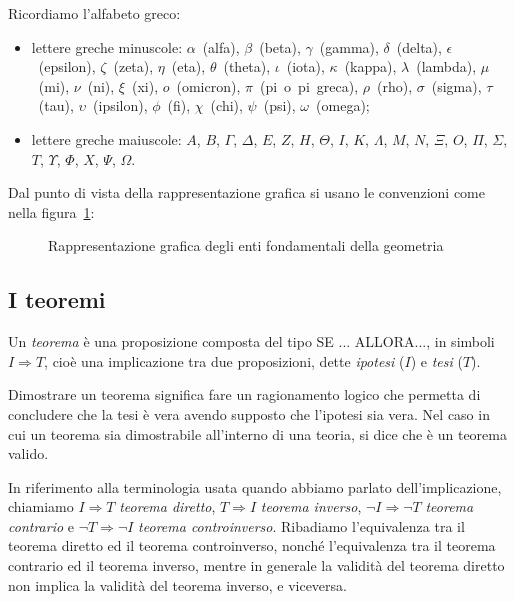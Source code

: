 Ricordiamo l'alfabeto greco:
\begin{itemize}
\item lettere greche minuscole:  $\alpha$~(alfa),  $\beta$~(beta),  
$\gamma$~(gamma),  $\delta$~(delta), $\epsilon$~(epsilon), 
$\zeta$~(zeta), $\eta$~(eta), $\theta$~(theta),  $\iota$~(iota),  
$\kappa$~(kappa), $\lambda$~(lambda), $\mu$~(mi), $\nu$~(ni),  
$\xi$~(xi), $o$~(omicron), $\pi$~(pi~o~pi~greca), $\rho$~(rho), 
$\sigma$~(sigma), $\tau$~(tau), $\upsilon$~(ipsilon), $\phi$~(fi), 
$\chi$~(chi), $\psi$~(psi), $\omega$~(omega);
\item lettere greche maiuscole: $A$, $B$, $ \Gamma $, $ \Delta $, $ E 
$, $ Z $, $ H $, $ \Theta $, $ I $, $ K $, $ \Lambda $, $ M $, $ N $, 
$ \Xi $, $ O $, $ \Pi $, $ \Sigma $, $ T $, $ \Upsilon $, $ \Phi $, $ 
X $, $ \Psi $, $\Omega $.
\end{itemize}

Dal punto di vista della rappresentazione grafica si usano le 
convenzioni come nella figura~\ref{fig:1.2}:
% 

\begin{inaccessibleblock}
 \begin{figure}[htb]
 \centering
 \caption{Rappresentazione grafica degli enti fondamentali della 
geometria}\label{fig:1.2}
\end{figure}
\end{inaccessibleblock}

\vspazio\ovalbox{\risolvi \ref{ese:1.32}}


\subsection{I teoremi}

Un \emph{teorema} è una proposizione composta del tipo SE ... ALLORA..., in 
simboli $I\Rightarrow 
T$, cioè una implicazione tra due proposizioni, dette \emph{ipotesi} 
($I$) e \emph{tesi} ($T$).

Dimostrare un teorema significa fare un ragionamento logico che 
permetta di concludere che la tesi è vera avendo supposto che 
l'ipotesi sia vera. Nel caso in cui un teorema sia dimostrabile 
all'interno di una teoria, si dice che è un teorema valido.

In riferimento alla terminologia usata quando abbiamo parlato 
dell'implicazione, chiamiamo  $I\Rightarrow T$ \emph{teorema 
	diretto}, $T\Rightarrow I$ \emph{teorema inverso}, $\neg I\Rightarrow 
\neg T$ \emph{teorema contrario} e $\neg T\Rightarrow \neg I$ 
\emph{teorema controinverso}. Ribadiamo l'equivalenza tra il teorema 
diretto ed il teorema controinverso, nonché l'equivalenza tra il 
teorema contrario ed il teorema inverso, mentre in generale la 
validità del teorema diretto non implica la validità del teorema 
inverso, e viceversa.

